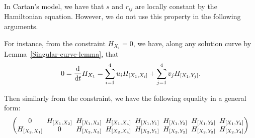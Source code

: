 \documentclass[pdftex]{sigma}
\numberwithin{equation}{section}
\theoremstyle{definition}
\newcommand{\0}{\boldsymbol{0}}
\begin{document}
\begin{Remark}
In Cartan's model, we have that $s$ and $r_{ij}$ are locally constant by the Hamiltonian equation.
However, we do not use this property in the following arguments.
\end{Remark}

For instance, from the constraint $H_{X_1} = 0$, we have, along any solution curve
by Lemma~\ref{Singular-curve-lemma}, that
\[
0 = \frac{{\rm d}}{{\rm d}t}H_{X_1} = \sum_{i=1}^4 u_iH_{[X_1, X_i]} + \sum_{j=1}^4 v_jH_{[X_1, Y_j]}.
\]

Then similarly from the constraint, we have the following equality in a general form:
\begin{gather*}
\begin{pmatrix}
0 \hspace{-2.3pt}&\hspace{-2.3pt} H_{[X_1, X_2]} \hspace{-2.3pt}&\hspace{-2.3pt} H_{[X_1, X_3]} \hspace{-2.3pt}&\hspace{-2.3pt} H_{[X_1, X_4]} \hspace{-2.3pt}&\hspace{-2.3pt} H_{[X_1, Y_1]} \hspace{-2.3pt}&\hspace{-2.3pt} H_{[X_1, Y_2]} \hspace{-2.3pt}&\hspace{-2.3pt} H_{[X_1, Y_3]} \hspace{-2.3pt}&\hspace{-2.3pt}
H_{[X_1, Y_4]}
\\
H_{[X_2, X_1]} \hspace{-2.3pt}&\hspace{-2.3pt} 0 \hspace{-2.3pt}&\hspace{-2.3pt} H_{[X_2, X_3]} \hspace{-2.3pt}&\hspace{-2.3pt} H_{[X_2, X_4]} \hspace{-2.3pt}&\hspace{-2.3pt} H_{[X_2, Y_1]} \hspace{-2.3pt}&\hspace{-2.3pt} H_{[X_2, Y_2]} \hspace{-2.3pt}&\hspace{-2.3pt} H_{[X_2, Y_3]} \hspace{-2.3pt}&\hspace{-2.3pt}
H_{[X_2, Y_4]}

\end{pmatrix}
\end{gather*}
\end{document}
